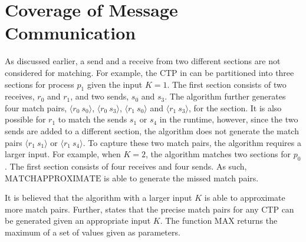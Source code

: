\section{Coverage of Message Communication}


As discussed earlier, a send and a receive from two different sections are not considered for matching. For example, the CTP in  can be partitioned into three sections for process $p_1$ given the input $K=1$. The first section consists of two receives, $r_0$ and $r_1$, and two sends, $s_0$ and $s_3$. The algorithm further generates four match pairs, $\langle r_0\ s_0\rangle$, $\langle r_0\ s_3\rangle$, $\langle r_1\ s_0\rangle$ and $\langle r_1\ s_3\rangle$, for the section. It is also possible for $r_1$ to match the sends $s_1$ or $s_4$ in the runtime, however, since the two sends are added to a different section, the algorithm does not generate the match pairs $\langle r_1\ s_1\rangle$ or $\langle r_1\ s_4\rangle$. To capture these two match pairs, the algorithm requires a larger input. For example, when $K=2$, the algorithm matches two sections for $p_0$. The first section consists of four receives and four sends. As such, $\mathrm{MATCHAPPROXIMATE}$ is able to generate the missed match pairs. 

It is believed that the algorithm with a larger input $K$ is able to approximate more match pairs. Further,  states that the precise match pairs for any CTP can be generated given an appropriate input $K$.
The function $\mathrm{MAX}$ returns the maximum of a set of values given as parameters.
 
